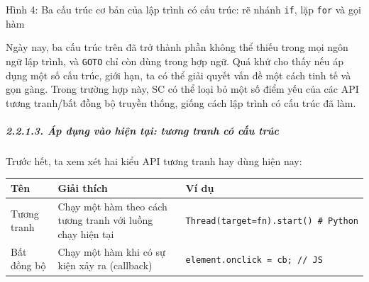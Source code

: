 Hình 4: Ba cấu trúc cơ bản của lập trình có cấu trúc: rẽ nhánh
\texttt{if}, lặp \texttt{for} và gọi hàm

Ngày nay, ba cấu trúc trên đã trở thành phần không thể thiếu trong mọi
ngôn ngữ lập trình, và \texttt{GOTO} chỉ còn dùng trong hợp ngữ. Quá khứ
cho thấy nếu áp dụng một số cấu trúc, giới hạn, ta có thể giải quyết vấn
đề một cách tinh tế và gọn gàng. Trong trường hợp này, SC có thể loại bỏ
một số điểm yếu của các API tương tranh/bất đồng bộ truyền thống, giống
cách lập trình có cấu trúc đã làm.

\hypertarget{uxe1p-dux1ee5ng-vuxe0o-hiux1ec7n-tux1ea1i-tux1b0ux1a1ng-tranh-cuxf3-cux1ea5u-truxfac}{%
  \subparagraph{2.2.1.3. Áp dụng vào hiện tại: tương tranh có cấu
    trúc}\label{uxe1p-dux1ee5ng-vuxe0o-hiux1ec7n-tux1ea1i-tux1b0ux1a1ng-tranh-cuxf3-cux1ea5u-truxfac}}

Trước hết, ta xem xét hai kiểu API tương tranh hay dùng hiện nay:

\begin{longtable}[]{@{}lll@{}}
  \toprule
  \begin{minipage}[b]{0.19\columnwidth}\raggedright
    Tên\strut
  \end{minipage} & \begin{minipage}[b]{0.46\columnwidth}\raggedright
    Giải thích\strut
  \end{minipage} & \begin{minipage}[b]{0.27\columnwidth}\raggedright
    Ví dụ\strut
  \end{minipage}\tabularnewline
  \midrule
  \endhead
  \begin{minipage}[t]{0.19\columnwidth}\raggedright
    Tương tranh\strut
  \end{minipage} & \begin{minipage}[t]{0.46\columnwidth}\raggedright
    Chạy một hàm theo cách tương tranh với luồng chạy hiện tại\strut
  \end{minipage} & \begin{minipage}[t]{0.27\columnwidth}\raggedright
    \texttt{Thread(target=fn).start()\ \#\ Python}\strut
  \end{minipage}\tabularnewline
  \begin{minipage}[t]{0.19\columnwidth}\raggedright
    Bất đồng bộ\strut
  \end{minipage} & \begin{minipage}[t]{0.46\columnwidth}\raggedright
    Chạy một hàm khi có sự kiện xảy ra (callback)\strut
  \end{minipage} & \begin{minipage}[t]{0.27\columnwidth}\raggedright
    \texttt{element.onclick\ =\ cb;\ //\ JS}\strut
  \end{minipage}\tabularnewline
  \bottomrule
\end{longtable}

